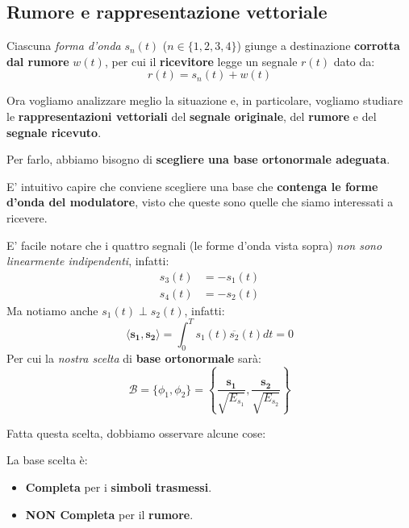 \subsection{Rumore e rappresentazione vettoriale}
\label{sez:08_02_01}

Ciascuna \textit{forma d'onda} $s_n(t)$ ($n\in \{1,2,3,4\}$) giunge a destinazione 
\textbf{corrotta dal rumore} $w(t)$, per cui il \textbf{ricevitore} legge 
un segnale $r(t)$ dato da:
\[
    r(t) = s_n(t) + w(t)
\]

Ora vogliamo analizzare meglio la situazione e, in particolare, vogliamo studiare 
le  \textbf{rappresentazioni vettoriali} del \textbf{segnale originale}, 
del \textbf{rumore} e del \textbf{segnale ricevuto}. 

Per farlo, abbiamo bisogno di \textbf{scegliere una base ortonormale adeguata}.

\begin{remark}
    E' intuitivo capire che conviene scegliere una base che 
    \textbf{contenga le forme d'onda del modulatore}, visto che queste
    sono quelle che siamo interessati a ricevere.
\end{remark}

E' facile notare che i quattro segnali (le forme d'onda vista sopra) 
\textit{non sono linearmente indipendenti}, infatti:
\[
    \begin{aligned}
        s_{3}(t) &= -s_{1}(t) \\ 
        s_{4}(t) &= -s_{2}(t)
    \end{aligned}
\]
Ma notiamo anche $s_{1}(t) \perp s_{2}(t)$, infatti:
\[
    \langle \mathbf{s_{1}} , \mathbf{s_{2}} \rangle = \int_{0}^T s_{1}(t) \overline{s_{2}}(t) dt = 0
\]
Per cui la \textit{nostra scelta} di \textbf{base ortonormale} sarà:
\[
    \mathcal{B} = \{\phi_{1}, \phi_{2}\} = 
        \left\{ \frac{\mathbf{s_{1}}}{\sqrt{E_{s_{1}}}}, \frac{\mathbf{s_{2}}}{\sqrt{E_{s_{2}}}} \right\}
\]

Fatta questa scelta, dobbiamo osservare alcune cose:

\begin{remark}
    La base scelta è:
    \begin{itemize}
        \item \textbf{Completa} per i \textbf{simboli trasmessi}.
        \item \textbf{NON Completa} per il \textbf{rumore}.
    \end{itemize}
\end{remark}

